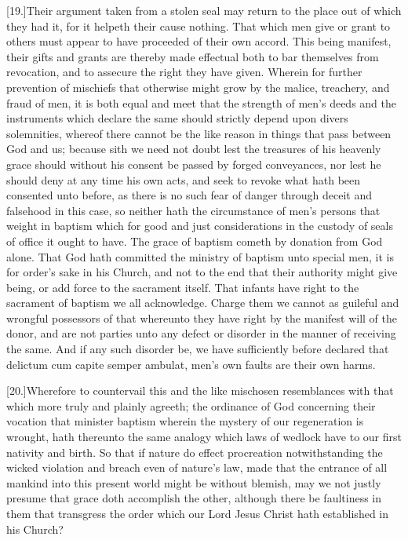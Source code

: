 [19.]Their argument taken from a stolen seal may return to the place out of which they had it, for it helpeth their cause nothing. That which men give or grant to others must appear to have proceeded of their own accord. This being manifest, their gifts and grants are thereby made effectual both to bar themselves from revocation, and to assecure the right they  have given.
 Wherein for further prevention of mischiefs that otherwise might grow by the malice, treachery, and fraud of men, it is both equal and meet that the strength of men’s deeds and the instruments which declare the same should strictly depend upon divers solemnities, whereof there cannot be the like reason in things that pass between God and us; because sith we need not doubt lest the treasures of his heavenly grace should without his consent be passed by forged conveyances, nor lest he should deny at any time his own acts, and seek to revoke what hath been consented unto before, as there is no such fear of danger through deceit and falsehood in this case, so neither hath the circumstance of men’s persons that weight in baptism which for good and just considerations in the custody of seals of office it ought to have. The grace of baptism cometh by donation from God alone. That God hath committed the ministry of baptism unto special men, it is for order’s sake in his Church, and not to the end that their authority might give being, or add force to the sacrament itself. That infants have right to the sacrament of baptism we all acknowledge. Charge them we cannot as guileful and wrongful possessors of that whereunto they have right by the manifest will of the donor, and are not parties unto any defect or disorder in the manner of receiving the same. And if any such disorder be, we have sufficiently before declared that delictum cum capite semper ambulat, men’s own faults are their own harms.

[20.]Wherefore to countervail this and the like mischosen resemblances with that which more truly and plainly agreeth; the ordinance of God concerning their vocation that minister baptism wherein the mystery of our regeneration is wrought, hath thereunto the same analogy which laws of wedlock have to our first nativity and birth. So that if nature do effect procreation notwithstanding the wicked violation and breach even of nature’s law, made that the entrance of all mankind into this present world might be without blemish, may we not justly presume that grace doth accomplish the other, although there be faultiness in them that transgress the order which our Lord Jesus Christ hath established in his Church?




